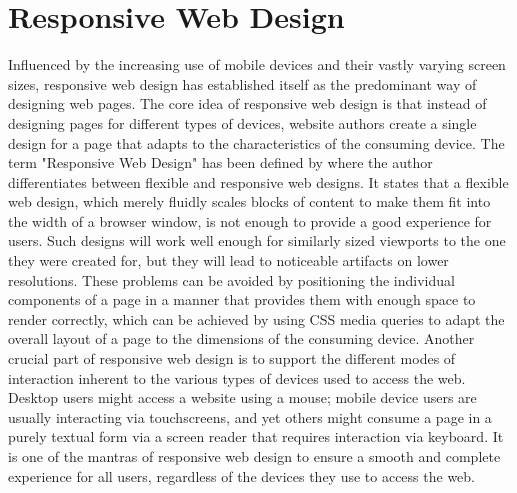 \section{Responsive Web Design}
\label{sec:RWD}

Influenced by the increasing use of mobile devices and their vastly varying screen sizes, responsive web design has established itself as the predominant way of designing web pages. 
The core idea of responsive web design is that instead of designing pages for different types of devices, website authors create a single design for a page that adapts to the characteristics of the consuming device. 
The term "Responsive Web Design" has been defined by \cite{ResponsiveWebDesign} where the author differentiates between flexible and responsive web designs. 
It states that a flexible web design, which merely fluidly scales blocks of content to make them fit into the width of a browser window, is not enough to provide a good experience for users. 
Such designs will work well enough for similarly sized viewports to the one they were created for, but they will lead to noticeable artifacts on lower resolutions. 
These problems can be avoided by positioning the individual components of a page in a manner that provides them with enough space to render correctly, which can be achieved by using CSS media queries to adapt the overall layout of a page to the dimensions of the consuming device. 
Another crucial part of responsive web design is to support the different modes of interaction inherent to the various types of devices used to access the web. 
Desktop users might access a website using a mouse; mobile device users are usually interacting via touchscreens, and yet others might consume a page in a purely textual form via a screen reader that requires interaction via keyboard. 
It is one of the mantras of responsive web design to ensure a smooth and complete experience for all users, regardless of the devices they use to access the web. 